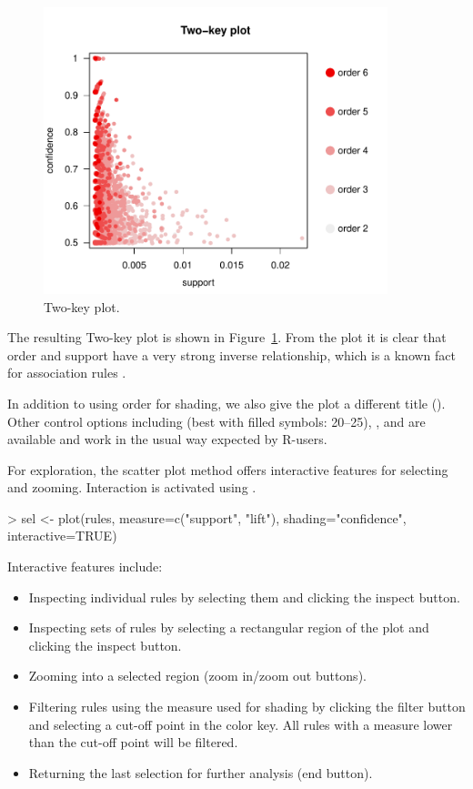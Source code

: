 \documentclass[nojss]{jss}
\begin{document}
\begin{figure}
\centering
\includegraphics[width=10cm]{arulesViz-scatterplot3}
\caption{Two-key plot.\label{fig:scatterplot3}}
\end{figure}

The resulting Two-key plot is shown in Figure~\ref{fig:scatterplot3}.
From the plot it is clear that order and support have a very strong
inverse relationship, which is a known fact for association rules
\citep{arulesViz:Seno:2005}.


In addition to using order for shading, we also give the plot a different
title ().
Other control options including  (best with filled symbols: 20--25),
,  and  are available and work in the
usual way expected by R-users.

For exploration,
the scatter plot method offers interactive features for selecting
and zooming. Interaction
is activated using .

\begin{Schunk}
\begin{Sinput}
> sel <- plot(rules, measure=c("support", "lift"), shading="confidence", interactive=TRUE)
\end{Sinput}
\end{Schunk}

Interactive features include:
\begin{itemize}
\item Inspecting individual rules by selecting them and clicking the
inspect button.
\item Inspecting sets of rules
by selecting a rectangular region of the plot and clicking the
inspect button.
\item Zooming into a selected region (zoom in/zoom out buttons).
\item Filtering rules using the measure used for shading
by clicking the filter button and selecting a cut-off point
in the color key. All rules with a measure lower than the cut-off
point will be filtered.
\item Returning the last selection for further analysis (end button).
\end{itemize}
\end{document}
